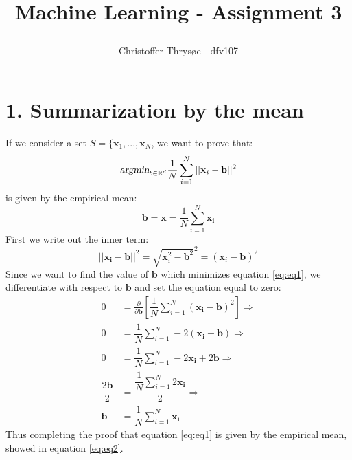 \documentclass{article}
\title{
\vspace{1in}
\textmd{\textbf{Machine Learning - Assignment 3}} \\
\author{Christoffer Thrysøe - dfv107}
}
\begin{document}
\maketitle
{}
\section{1. Summarization by the mean}
If we consider a set $S = \lbrace \mathbf{x}_1,...,\mathbf{x}_N$, we want to prove that:
\begin{equation}
\textsl{argmin}_{b \in \mathbb{R}^d} \dfrac{1}{N} \sum\limits_{i=1}^N ||\mathbf{x}_i-\mathbf{b}||^2
\label{eq:eq1}
\end{equation} 
is given by the empirical mean:
\begin{equation}
\mathbf{b} = \bar{\mathbf{x}} = \dfrac{1}{N} \sum\limits_{i=1}^N \mathbf{x_i}
\label{eq:eq2}
\end{equation}
First we write out the inner term:
\begin{equation*}
||\mathbf{x_i}-\mathbf{b}||^2 = \sqrt{\mathbf{x}_i^2-\mathbf{b}^2} ^2 = \left(\mathbf{x}_i - \mathbf{b} \right)^2
\end{equation*}
Since we want to find the value of $\mathbf{b}$ which minimizes equation \ref{eq:eq1}, we differentiate with respect to $\mathbf{b}$ and set the equation equal to zero:
\begin{align*}
0 &= \frac{\partial}{\partial \mathbf{b}} \left[
\dfrac{1}{N} \sum\limits_{i=1}^N \left(\mathbf{x_i}-\mathbf{b}\right)^2
\right] \Rightarrow \\
0 &= \dfrac{1}{N} \sum\limits_{i=1}^N -2 \left(\mathbf{x_i}-\mathbf{b}\right) \Rightarrow \\
0 &= \dfrac{1}{N} \sum\limits_{i=1}^N -2\mathbf{x_i} + 2\mathbf{b} \Rightarrow \\
\dfrac{2\mathbf{b}}{2} &= \dfrac{\dfrac{1}{N} \sum\limits_{i=1}^N 2\mathbf{x_i}}{2} \Rightarrow \\
\mathbf{b} &= \dfrac{1}{N} \sum\limits_{i=1}^N \mathbf{x_i}
\end{align*}
Thus completing the proof that equation \ref{eq:eq1} is given by the empirical mean, showed in equation \ref{eq:eq2}.
\end{document}
